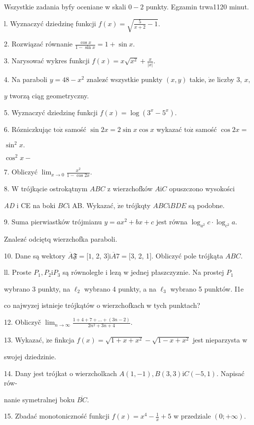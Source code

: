 \documentclass[a4paper,12pt]{article}
\begin{document}
Wszystkie zadania byfy oceniane w skali $0-2$ punkty. Egzamin trwa1120 minut.

l. Wyznaczyć dziedzinę funkcji $f(x)=\sqrt{\frac{5}{x+2}-1}.$

2. Rozwiązać równanie $\displaystyle \frac{\cos x}{1-\sin x}=1+\sin x.$

3. Narysować wykres funkcji $f(x)=x\displaystyle \sqrt{x^{2}}+\frac{x}{|x|}.$

4. Na paraboli $y=48-x^{2}$ znalez$\acute{}$ć wszystkie punkty $(x,y)$ takie, $\dot{\mathrm{z}}\mathrm{e}$ liczby 3, $x,$

$y$ tworzą ciąg geometryczny.

5. Wyznaczyć dziedzinę funkcji $f(x)=\log(3^{x}-5^{x}).$

6. Rózniczkując $\mathrm{t}\mathrm{o}\dot{\mathrm{z}}$ samość $\sin 2x=2\sin x\cos x$ wykazać $\mathrm{t}\mathrm{o}\dot{\mathrm{z}}$ samość $\cos 2x=$

$\sin^{2}x.$

$\cos^{2}x-$

7. Obliczyć $\displaystyle \lim_{x\rightarrow 0}\frac{x^{2}}{1-\cos 2x}.$

8. $\mathrm{W}$ trójkącie ostrokątnym $ABC$ z wierzchofków $A\mathrm{i}C$ opuszczono wysokości

{\it AD} $\mathrm{i}$ CE na boki $BC\mathrm{i}$ AB. Wykazać, $\dot{\mathrm{z}}\mathrm{e}$ trójkqty $ABC\mathrm{i}BDE$ są podobne.

9. Suma pierwiastków trójmianu $y = ax^{2}+bx+c$ jest równa $\log_{a^{2}}c\cdot\log_{c^{2}}a.$

Znalez$\acute{}$ć odciętq wierzchofka paraboli.

10. Dane są wektory $\overline{A}\mathfrak{F}=[1$, 2, 3$]\mathrm{i}\overline{A}7=[3$, 2, 1$]$. Obliczyć pole trójkąta $ABC.$

ll. Proste $P_{1}, P_{2} \mathrm{i}P_{3}$ są równoległe i lezą w jednej płaszczyz$\acute{}$nie. Na prostej $P_{1}$

wybrano 3 punkty, na $\ell_{2}$ wybrano 4 punkty, a na $\ell_{3}$ wybrano 5 punktów. I1e

co najwyzej istnieje trójkątów o wierzchofkach w tych punktach?

12. Obliczyč $\displaystyle \lim_{n\rightarrow\infty}\frac{1+4+7+\ldots+(3n-2)}{2n^{2}+3n+4}.$

13. Wykazać, $\dot{\mathrm{z}}\mathrm{e}$ finkcja $f(x) = \sqrt{1+x+x^{2}}-\sqrt{1-x+x^{2}}$ jest nieparzysta w

swojej dziedzinie.

14. Dany jest trójkat o wierzcholkach $A(1,-1), B(3,3)\mathrm{i}C(-5,1)$. Napisać rów-

nanie symetralnej boku $\overline{BC}.$

15. Zbadać monotoniczność funkcji $f(x)=x^{4}-\displaystyle \frac{1}{x}+5$ w przedziale $(0;+\infty).$
\end{document}
